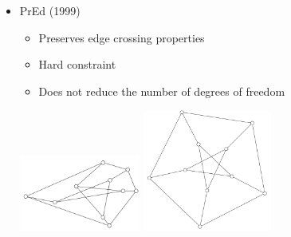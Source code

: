 \begin{frame}
  \frametitle{\insertsubsection}
  \begin{itemize}
    \item PrEd (1999) \begin{itemize}
      \item Preserves edge crossing properties
      \item Hard constraint
      \item Does not reduce the number of degrees of freedom
    \end{itemize}
    \vspace{0.5cm}
    \centering
    \includegraphics[height=2.5cm,natwidth=440,natheight=276]{Resources/PrEd-before.png}
    \hspace{0.5cm}
    \includegraphics[height=4cm,natwidth=520,natheight=492]{Resources/PrEd-after.png}
  \end{itemize}
\end{frame}
